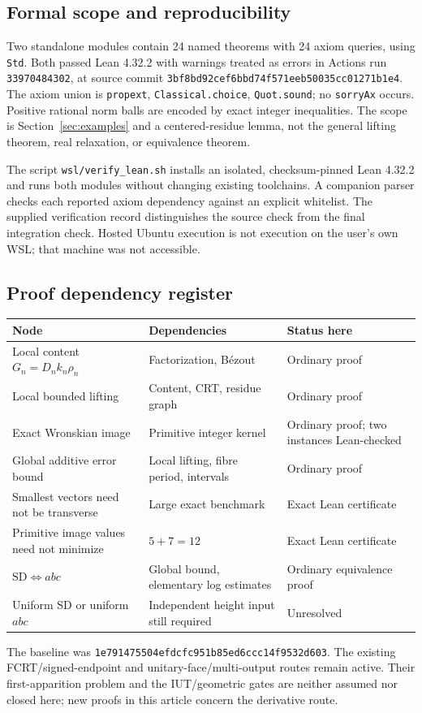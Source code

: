 \documentclass[11pt]{article}
\theoremstyle{definition}
\theoremstyle{remark}
\begin{document}
\subsection{Formal scope and reproducibility}
Two standalone modules contain 24 named theorems with 24 axiom queries, using \texttt{Std}. Both passed Lean 4.32.2 with warnings treated as errors in Actions run \texttt{33970484302}, at source commit \texttt{3bf8bd92cef6bbd74f571eeb50035cc01271b1e4}. The axiom union is \texttt{propext}, \texttt{Classical.choice}, \texttt{Quot.sound}; no \texttt{sorryAx} occurs. Positive rational norm balls are encoded by exact integer inequalities. The scope is Section~\ref{sec:examples} and a centered-residue lemma, not the general lifting theorem, real relaxation, or equivalence theorem.

The script \texttt{wsl/verify\_lean.sh} installs an isolated, checksum-pinned Lean 4.32.2 and runs both modules without changing existing toolchains. A companion parser checks each reported axiom dependency against an explicit whitelist. The supplied verification record distinguishes the source check from the final integration check. Hosted Ubuntu execution is not execution on the user's own WSL; that machine was not accessible.

\subsection{Proof dependency register}
\begin{center}\small
\begin{tabular}{p{}p{}p{}}
\toprule
Node & Dependencies & Status here\\
\midrule
Local content $G_n=D_nk_n\rho_n$ & Factorization, B\'ezout & Ordinary proof\\
Local bounded lifting & Content, CRT, residue graph & Ordinary proof\\
Exact Wronskian image & Primitive integer kernel & Ordinary proof; two instances Lean-checked\\
Global additive error bound & Local lifting, fibre period, intervals & Ordinary proof\\
Smallest vectors need not be transverse & Large exact benchmark & Exact Lean certificate\\
Primitive image values need not minimize & $5+7=12$ & Exact Lean certificate\\
$\mathrm{SD}\Longleftrightarrow abc$ & Global bound, elementary log estimates & Ordinary equivalence proof\\
Uniform $\mathrm{SD}$ or uniform $abc$ & Independent height input still required & Unresolved\\
\bottomrule
\end{tabular}
\end{center}
The baseline was \texttt{1e791475504efdcfc951b85ed6ccc14f9532d603}. The existing FCRT/signed-endpoint and unitary-face/multi-output routes \cite{signed,multiflag} remain active. Their first-apparition problem and the IUT/geometric gates are neither assumed nor closed here; new proofs in this article concern the derivative route.
\end{document}
